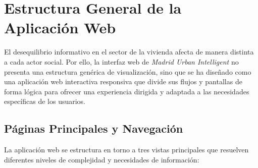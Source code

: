 \documentclass[a4paper,11pt,openany]{book}
\begin{document}
\section{Estructura General de la Aplicación Web}
El desequilibrio informativo en el sector de la vivienda afecta de manera distinta a cada actor social. Por ello, la interfaz web de \textit{Madrid Urban Intelligent} no presenta una estructura genérica de visualización, sino que se ha diseñado como una aplicación web interactiva responsiva que divide sus flujos y pantallas de forma lógica para ofrecer una experiencia dirigida y adaptada a las necesidades específicas de los usuarios.

\subsection{Páginas Principales y Navegación}
La aplicación web se estructura en torno a tres vistas principales que resuelven diferentes niveles de complejidad y necesidades de información:
\end{document}
